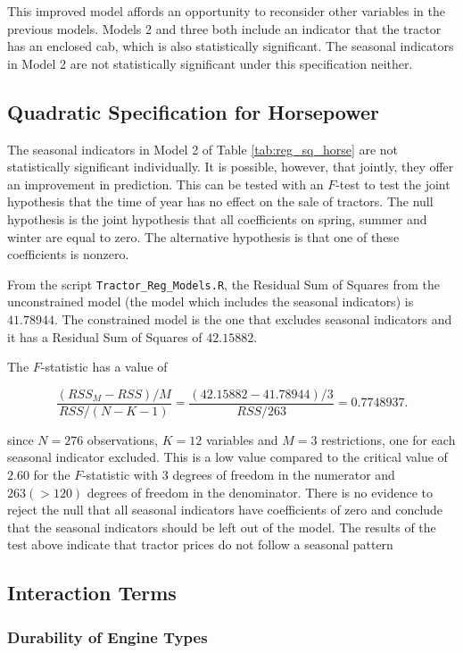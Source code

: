 \documentclass[11pt]{paper}
\begin{document}
This improved model affords an opportunity
to reconsider other variables in the previous models.
Models 2 and three both include an indicator that the
tractor has an enclosed cab, 
which is also statistically significant. 
The seasonal indicators in Model 2 are not statistically significant under this specification neither. 

\clearpage
\subsection{Quadratic Specification for Horsepower}


The seasonal indicators in Model 2 
of Table \ref{tab:reg_sq_horse}
are not statistically significant individually.
It is possible, however, that jointly, they 
offer an improvement in prediction. 
This can be tested with an $F$-test
to test the joint hypothesis that the time of year has no effect on the sale of tractors. 
%
The null hypothesis is the joint hypothesis that all coefficients on spring, summer and winter are equal to zero. 
The alternative hypothesis is that one of these coefficients is nonzero. 
% 

From the script \texttt{Tractor\_Reg\_Models.R}, the Residual Sum of Squares from the unconstrained model (the model which includes the seasonal indicators) is $41.78944$. 
The constrained model is the one that excludes seasonal indicators and it has a Residual Sum of Squares of $42.15882$.

The $F$-statistic has a value of 

$$ 
\frac{(RSS_M - RSS)/M}{RSS/(N - K - 1)} = \frac{(42.15882 - 41.78944)/3}{RSS/263} = 0.7748937. 
$$

since $N = 276$ observations, $K = 12$ variables and $M = 3$ restrictions, one for each seasonal indicator excluded. 
This is a low value compared to the critical value of $2.60$ for the $F$-statistic with $3$ degrees of freedom in the numerator and $263 (> 120)$ degrees of freedom in the denominator. 
There is no evidence to reject the null that all seasonal indicators have coefficients of zero and conclude that the seasonal indicators should be left out of the model. 
%
The results of the test above indicate that tractor prices do not follow a seasonal pattern


\clearpage
\subsection{Interaction Terms}

\subsubsection{Durability of Engine Types}
\end{document}
